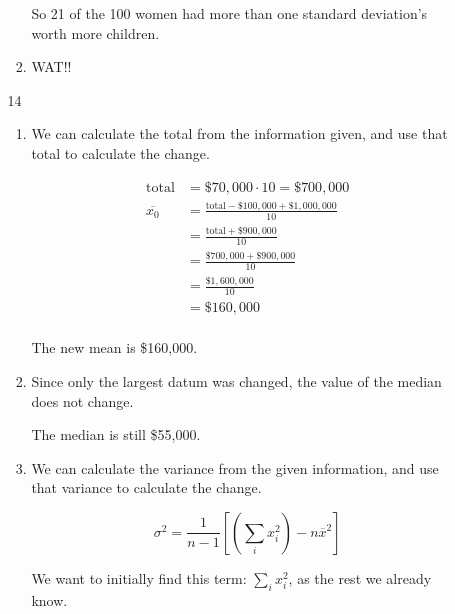 \documentclass[12pt,letterpaper]{article}
\begin{document}
\begin{enumerate}
\begin{enumerate}
\begin{enumerate}[label=\arabic* )]
              So 21 of the 100 women had more than one standard deviation's worth more children.

            \item
              WAT!!
          \end{enumerate}
        \item [14]
          \begin{enumerate}[label=\arabic* )]
            \item
              We can calculate the total from the information given,
              and use that total to calculate the change.

              \begin{align*}
                \text{total} &= \$70,000 \cdot 10 = \$700,000 \\
                \overline{x_0} &= \frac{\text{total} - \$100,000 + \$1,000,000}{10} \\
                &= \frac{\text{total} + \$900,000}{10} \\
                &= \frac{\$700,000 + \$900,000}{10} \\
                &= \frac{\$1,600,000}{10} \\
                &= \$160,000 \\
              \end{align*}

              The new mean is \$160,000.

            \item
              Since only the largest datum was changed,
              the value of the median does not change.

              The median is still \$55,000.

            \item
              We can calculate the variance from the given information,
              and use that variance to calculate the change.

              \[
                \sigma^2 = \frac{1}{n - 1} \left[\left(\sum_{i} x_i^2\right) - n \overline{x}^2\right]
              \]

              We want to initially find this term: $\sum_{i} x_i^2$, as the rest we already know.


\end{enumerate}
\end{enumerate}
\end{enumerate}
\end{document}
